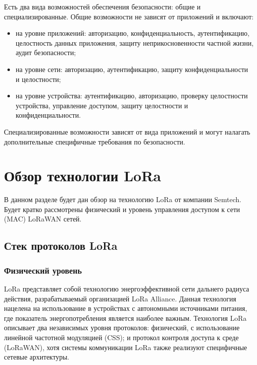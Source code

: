 Есть два вида возможностей обеспечения безопасности: общие и специализированные.
Общие возможности не зависят от приложений и включают:
\begin{itemize}
	\item на уровне приложений: авторизацию, конфиденциальность, аутентификацию, целостность данных приложения, защиту неприкосновенности частной жизни, аудит безопасности;
	\item на уровне сети: авторизацию, аутентификацию, защиту конфиденциальности и целостности;
	\item на уровне устройства: аутентификацию, авторизацию, проверку целостности устройства, управление доступом, защиту целостности и конфиденциальности.
\end{itemize}

Специализированные возможности зависят от вида приложений и могут налагать дополнительные специфичные требования по безопасности.

\newpage
\section{Обзор технологии LoRa} 

В данном разделе будет дан обзор на технологию LoRa от компании Semtech.
Будет кратко рассмотрены физический и уровень управления доступом к сети (MAC) LoRaWAN сетей.

\subsection{Стек протоколов LoRa}

\subsubsection{Физический уровень}

LoRa представляет собой технологию энергоэффективной сети дальнего радиуса действия, разрабатываемый организацией LoRa Alliance.
Данная технология нацелена на использование в устройствах с автономными источниками питания, где показатель энергопотребления является наиболее важным.
Технология LoRa описывает два независимых уровня протоколов: физический, с использование линейной частотной модуляцией (CSS); и протокол контроля доступа к среде (LoRaWAN), хотя системы коммуникации LoRa также реализуют специфичные сетевые архитектуры\cite{augustin2016}.


